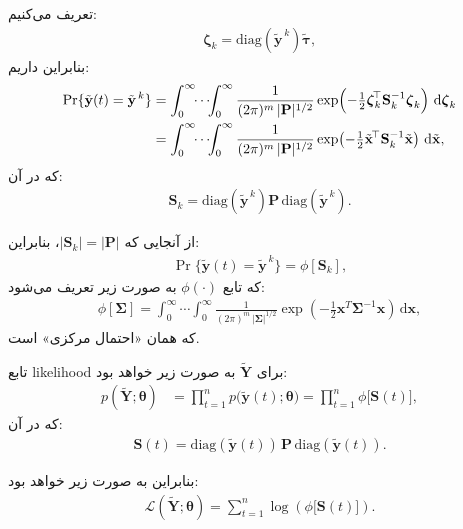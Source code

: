 تعریف می‌کنیم:
\begin{align}
	\boldsymbol{\zeta}_k = \mathrm{diag}(\tilde{\mathbf{y}}^{\,k})\tilde{\boldsymbol{\tau}},
\end{align}
بنابراین داریم:
\begin{align}
	\Pr\{\tilde{\mathbf{y}}(t)=\tilde{\mathbf{y}}^{\,k}\}
	&= \int_{0}^{\infty}\!\!\cdots\!\!\int_{0}^{\infty}
	\frac{1}{(2\pi)^m\,|\mathbf{P}|^{1/2}}
	\exp\!\left(-\tfrac12\boldsymbol{\zeta}_k^{\!\top}\mathbf{S}_k^{-1}\boldsymbol{\zeta}_k\right)\,\mathrm{d}\boldsymbol{\zeta}_k \notag \\
	&= \int_{0}^{\infty}\!\!\cdots\!\!\int_{0}^{\infty}
	\frac{1}{(2\pi)^m\,|\mathbf{P}|^{1/2}}
	\exp\!\left(-\tfrac12\tilde{\mathbf{x}}^{\!\top}\mathbf{S}_k^{-1}\tilde{\mathbf{x}}\right)\,\mathrm{d}\tilde{\mathbf{x}},
\end{align}
که در آن:
\begin{align}
	\mathbf{S}_k = \mathrm{diag}(\tilde{\mathbf{y}}^{\,k})\mathbf{P}\,\mathrm{diag}(\tilde{\mathbf{y}}^{\,k}).
\end{align}

از آنجایی که
$|\mathbf{S}_k| = |\mathbf{P}|$،
بنابراین:
\begin{align}
	\Pr\{\tilde{\mathbf{y}}(t)=\tilde{\mathbf{y}}^{\,k}\} 
	= \phi[\mathbf{S}_k],
\end{align}
که تابع
$\phi(\cdot)$
 به صورت زیر تعریف می‌شود:
\begin{align}
	\phi[\mathbf{\Sigma}]
	= \int_{0}^{\infty}\cdots\int_{0}^{\infty}
	\frac{1}{(2\pi)^m\,|\mathbf{\Sigma}|^{1/2}}
	\exp\!\left(-\tfrac12\mathbf{x}^T\mathbf{\Sigma}^{-1}\mathbf{x}\right)\,\mathrm{d}\mathbf{x},
\end{align}
که همان «احتمال  مرکزی» است.

تابع likelihood برای
$\tilde{\mathbf{Y}}$
به صورت زیر خواهد بود:
\begin{align}
	p(\tilde{\mathbf{Y}};\boldsymbol{\theta})
	&= \prod_{t=1}^n p\bigl(\tilde{\mathbf{y}}(t);\boldsymbol{\theta}\bigr)
	= \prod_{t=1}^n \phi\bigl[\mathbf{S}(t)\bigr],
\end{align}
که در آن:
\begin{align}
	\mathbf{S}(t)=\mathrm{diag}(\tilde{\mathbf{y}}(t))\,\mathbf{P}\,\mathrm{diag}(\tilde{\mathbf{y}}(t)).
\end{align}

بنابراین  به صورت زیر خواهد بود:
\begin{align}
	\mathcal{L}(\tilde{\mathbf{Y}};\boldsymbol{\theta})
	= \sum_{t=1}^n \log\left(\phi\bigl[\mathbf{S}(t)\bigr]\right).
\end{align}


